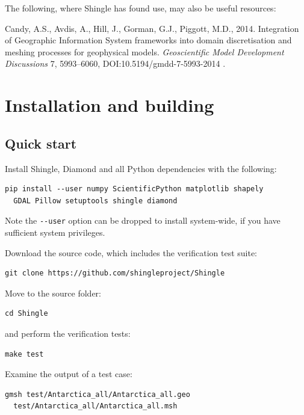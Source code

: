 \documentclass[a4paper, 10pt]{book}
\providecommand{\shingle}{Shingle\xspace}
\begin{document}
\medskip
\noindent
The following, where \shingle has found use, may also be useful resources:
\par\vskip 4pt\noindent\hspace{0.02\columnwidth}%
\begin{minipage}{0.9\columnwidth}%
Candy, A.S., Avdis, A., Hill, J., Gorman, G.J., Piggott, M.D., 2014.
Integration of Geographic Information System frameworks into domain discretisation and meshing processes for geophysical models.
\emph{Geoscientific Model Development Discussions} 7, 5993--6060, DOI:10.5194/gmdd-7-5993-2014 \citep{candygis}.
\end{minipage}




\chapter{Installation and building}
%
\section{Quick start}

\noindent
Install \shingle, Diamond and all Python dependencies with the following:
\begin{verbatim}
pip install --user numpy ScientificPython matplotlib shapely
  GDAL Pillow setuptools shingle diamond
\end{verbatim}
Note the \verb+--user+ option can be dropped to install system-wide, if you have sufficient system privileges. 
\vspace{1ex}

\noindent
Download the source code, which includes the verification test suite:
\begin{verbatim}
git clone https://github.com/shingleproject/Shingle
\end{verbatim}

\noindent
Move to the source folder:
\begin{verbatim}
cd Shingle
\end{verbatim}

\noindent
and perform the verification tests:
\begin{verbatim}
make test
\end{verbatim}

\noindent
Examine the output of a test case:
\begin{verbatim}
gmsh test/Antarctica_all/Antarctica_all.geo 
  test/Antarctica_all/Antarctica_all.msh
\end{verbatim}
\end{document}
